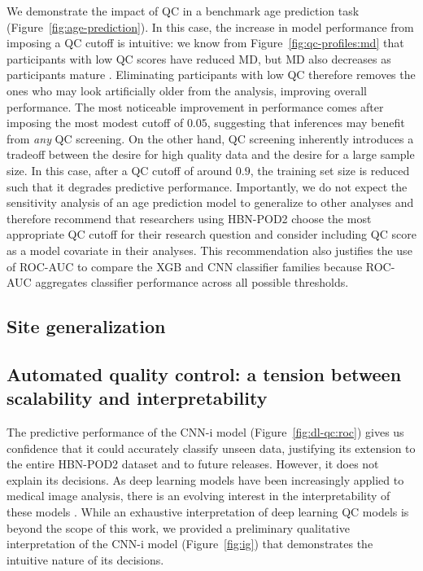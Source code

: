 \documentclass[9pt,lineno]{elife}
\begin{document}
We demonstrate the impact of QC in a benchmark age prediction task
(Figure~\ref{fig:age-prediction}). In this case, the increase in model performance
from imposing a QC cutoff is intuitive: we know from
Figure~\ref{fig:qc-profiles:md} that participants with low QC scores have
reduced MD, but MD also decreases as participants mature
\citep{yeatman2014lifespan,richie-halford2021multidimensional}. Eliminating
participants with low QC therefore removes the ones who may look artificially older
from the analysis, improving overall performance. The most noticeable
improvement in performance comes after imposing the most modest cutoff of
$0.05$, suggesting that inferences may benefit from \emph{any} QC screening. On
the other hand, QC screening inherently introduces a tradeoff between the desire
for high quality data and the desire for a large sample size. In this case,
after a QC cutoff of around $0.9$, the training set size is reduced such that it
degrades predictive performance. Importantly, we do not expect the sensitivity
analysis of an age prediction model to generalize to other analyses and therefore
recommend that researchers using HBN-POD2 choose the most appropriate QC cutoff for their research question and consider including QC score as a model covariate in their analyses.
This recommendation also justifies the use of ROC-AUC to compare the XGB and CNN classifier families because ROC-AUC aggregates classifier performance across all possible thresholds.

\subsection{Site generalization}


\subsection{Automated quality control: a tension between scalability and interpretability}

The predictive
performance of the CNN-i model (Figure~\ref{fig:dl-qc:roc}) gives
us confidence that it could accurately classify unseen data, justifying its
extension to the entire HBN-POD2 dataset and to future releases. However, it
does not explain its decisions. As deep learning models have been increasingly
applied to medical image analysis, there is an evolving interest in the
interpretability of these models \citep{salahuddin2022transparency, lipton2017doctor,
Zech2018-ki, Ghassemi2021-zg}. While an
exhaustive interpretation of deep learning QC models is beyond the scope of this
work, we provided a preliminary qualitative interpretation of the CNN-i model
(Figure~\ref{fig:ig}) that demonstrates the intuitive nature of its decisions.
\end{document}
